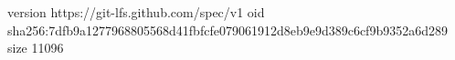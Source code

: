 version https://git-lfs.github.com/spec/v1
oid sha256:7dfb9a1277968805568d41fbfcfe079061912d8eb9e9d389c6cf9b9352a6d289
size 11096

